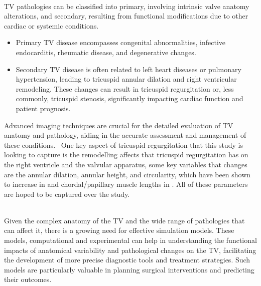 \\
\gls{TV} pathologies can be classified into primary, involving intrinsic valve anatomy alterations, and secondary, resulting from functional modifications due to other cardiac or systemic conditions.
\begin{itemize}
    \item Primary \gls{TV} disease encompasses congenital abnormalities, infective endocarditis, rheumatic disease, and degenerative changes.
    \item Secondary \gls{TV} disease is often related to left heart diseases or pulmonary hypertension, leading to tricuspid annular dilation and right ventricular remodeling. These changes can result in tricuspid regurgitation or, less commonly, tricuspid stenosis, significantly impacting cardiac function and patient prognosis.
\end{itemize}
Advanced imaging techniques are crucial for the detailed evaluation of \gls{TV} anatomy and pathology, aiding in the accurate assessment and management of these conditions.~ One key aspect of tricuspid regurgitation that this study is looking to capture is the remodelling affects that tricuspid regurgitation has on the right ventricle and the valvular apparatus, some key variables that changes are the annular dilation, annular height, and circularity, which have been shown to increase in  and chordal/papillary muscle lengths in . All of these parameters are hoped to be captured over the study.

\\
Given the complex anatomy of the \gls{TV} and the wide range of pathologies that can affect it, there is a growing need for effective simulation models. These models, computational and experimental can help in understanding the functional impacts of anatomical variability and pathological changes on the \gls{TV}, facilitating the development of more precise diagnostic tools and treatment strategies. Such models are particularly valuable in planning surgical interventions and predicting their outcomes.

